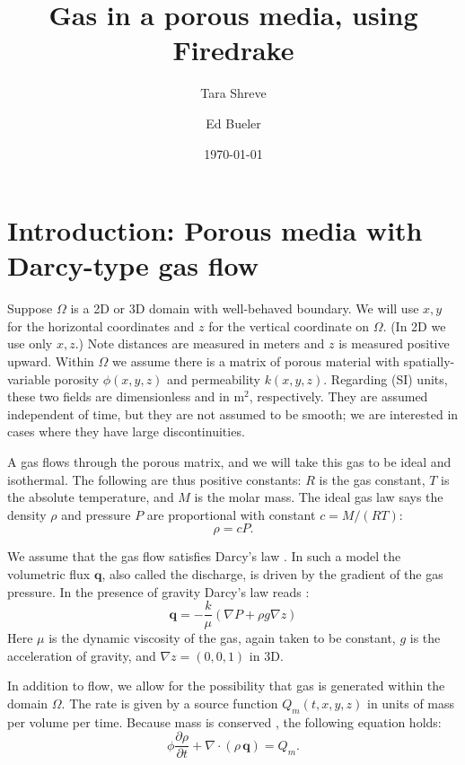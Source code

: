 \documentclass[11pt]{amsart}
\title{Gas in a porous media, using Firedrake}
\author{Tara Shreve}
\author{Ed Bueler}
\date{\today}
\newcommand{\bq}{\mathbf{q}}
\newcommand{\Div}{\nabla\cdot}
\newcommand{\grad}{\nabla}
\begin{document}
\maketitle

\thispagestyle{empty}

\section{Introduction: Porous media with Darcy-type gas flow}

Suppose $\Omega$ is a 2D or 3D domain with well-behaved boundary.  We will use $x,y$ for the horizontal coordinates and $z$ for the vertical coordinate on $\Omega$.  (In 2D we use only $x,z$.)  Note distances are measured in meters and $z$ is measured positive upward.  Within $\Omega$ we assume there is a matrix of porous material with spatially-variable porosity $\phi(x,y,z)$ and permeability $k(x,y,z)$.  Regarding (SI) units, these two fields are dimensionless and in $\text{m}^2$, respectively.  They are assumed independent of time, but they are not assumed to be smooth; we are interested in cases where they have large discontinuities.

A gas flows through the porous matrix, and we will take this gas to be ideal and isothermal.  The following are thus positive constants: $R$ is the gas constant, $T$ is the absolute temperature, and $M$ is the molar mass.  The ideal gas law says the density $\rho$ and pressure $P$ are proportional with constant $c = M/(RT)$:
\begin{equation}
\rho = c P.  \label{eq:ideal}
\end{equation}

We assume that the gas flow satisfies Darcy's law \citep{Fowler2011}.  In such a model the volumetric flux $\bq$, also called the discharge, is driven by the gradient of the gas pressure.  In the presence of gravity Darcy's law reads \citep{Collinson2012}:
\begin{equation}
\bq = - \frac{k}{\mu} \left(\grad P + \rho g \grad z\right) \label{eq:pmtime:darcy}
\end{equation}
Here $\mu$ is the dynamic viscosity of the gas, again taken to be constant, $g$ is the acceleration of gravity, and $\grad z = (0,0,1)$ in 3D.  

In addition to flow, we allow for the possibility that gas is generated within the domain $\Omega$.  The rate is given by a source function $Q_m(t,x,y,z)$ in units of mass per volume per time.  Because mass is conserved \citep{Tadmor2012}, the following equation holds:
\begin{equation}
\phi \frac{\partial \rho}{\partial t} + \Div \left(\rho\, \bq\right) = Q_m. \label{eq:pmtime:masscont}
\end{equation}
\end{document}
